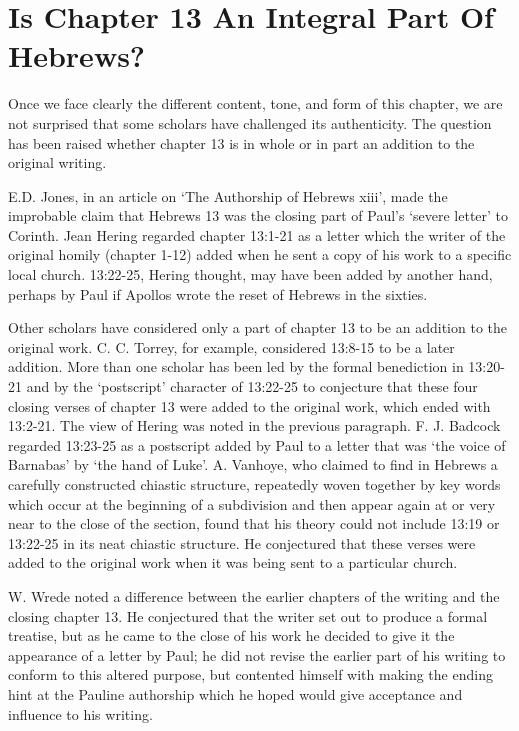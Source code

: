 \newpage
\section{Is Chapter 13 An Integral Part Of Hebrews?}
Once we face clearly the different content, tone, and form of this chapter, we
are not surprised that some scholars have challenged its authenticity.
The question has been raised whether chapter 13 is in whole or in part an
addition to the original writing.
\newline

E.D. Jones, in an article on `The Authorship of Hebrews xiii', made the
improbable claim that Hebrews 13 was the closing part of Paul's `severe letter'
to Corinth.
Jean Hering regarded chapter 13:1-21 as a letter which the writer of the
original homily (chapter 1-12) added when he sent a copy of his work to a
specific local church.
13:22-25, Hering thought, may have been added by another hand, perhaps by Paul
if Apollos wrote the reset of Hebrews in the sixties.
\newline

Other scholars have considered only a part of chapter 13 to be an addition to
the original work.
C. C. Torrey, for example, considered 13:8-15 to be a later addition.
More than one scholar has been led by the formal benediction in 13:20-21 and
by the `postscript' character of 13:22-25 to conjecture that these four closing
verses of chapter 13 were added to the original work, which ended with 13:2-21.
The view of Hering was noted in the previous paragraph.
F. J. Badcock regarded 13:23-25 as a postscript added by Paul to a letter that
was `the voice of Barnabas' by `the hand of Luke'.
A. Vanhoye, who claimed to find in Hebrews a carefully constructed chiastic
structure, repeatedly woven together by key words which occur at the beginning
of a subdivision and then appear again at or very near to the close of the
section, found that his theory could not include 13:19 or 13:22-25 in its neat
chiastic structure.
He conjectured that these verses were added to the original work when it was
being sent to a particular church.
\newline

W. Wrede noted a difference between the earlier chapters of the writing and the
closing chapter 13.
He conjectured that the writer set out to produce a formal treatise, but as he
came to the close of his work he decided to give it the appearance of a letter
by Paul; he did not revise the earlier part of his writing to conform to this
altered purpose, but contented himself with making the ending hint at the
Pauline authorship which he hoped would give acceptance and influence to his
writing.
\newline

